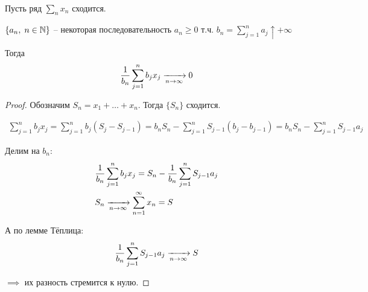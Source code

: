 \begin{lemma}[Кронекер]~

  Пусть ряд $\sum\limits_n x_n$ сходится.

  $\{a_n,\; n \in \mathbb{N}\}$ -- некоторая последовательность $a_n \geq 0$ т.ч. 
  $b_n = \sum\limits_{j = 1}^{n} a_j \uparrow +\infty$

  Тогда 
  \begin{align*}
    \frac{1}{b_n} \sum\limits_{j = 1}^{n} b_j x_j \xrightarrow[n \to \infty]{} 0
  \end{align*}

  \begin{proof}
    Обозначим $S_n = x_1 + \ldots + x_n$. Тогда $\{ S_n \}$ сходится.
    
    \begin{align*}
      \sum_{j = 1}^{n} b_j x_j = \sum_{j = 1}^{n} b_j (S_j - S_{j - 1}) 
      = b_n S_n - \sum_{j = 1}^{n} S_{j - 1} (b_j - b_{j - 1}) = 
      b_n S_n - \sum_{j = 1}^{n} S_{j - 1} a_j
    \end{align*}

    Делим на $b_n$:
    \begin{align*}
      &\frac{1}{b_n} \sum_{j = 1}^{n} b_j x_j = S_n - \frac{1}{b_n} \sum_{j = 1}^{n} S_{j - 1} a_j\\
      &S_n \xrightarrow[n \to \infty]{} \sum_{n = 1}^{\infty} x_n = S
    \end{align*}

    А по лемме Тёплица:
    \begin{align*}
      \frac{1}{b_n} \sum_{j = 1}^{n} S_{j - 1} a_j \xrightarrow[n \to \infty]{} S
    \end{align*}

    $\implies$ их разность стремится к нулю.
  \end{proof}

\end{lemma}

